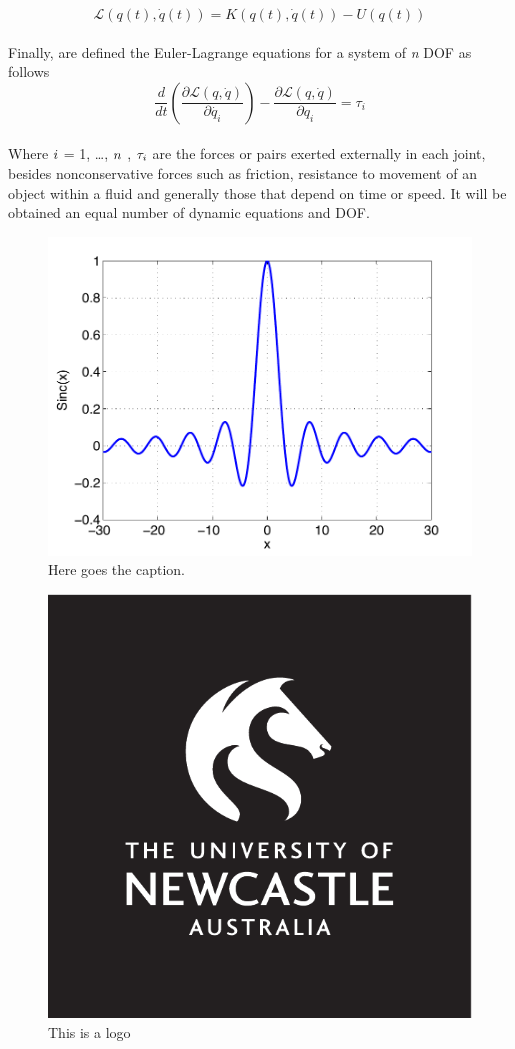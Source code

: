 \documentclass{UoNMCHA}
\numberwithin{equation}{section}
\begin{document}
\begin{equation}\label{eq:Lagrangian general term}
\mathcal{L}(q(t),\dot{q}(t)) = K(q(t),\dot{q}(t)) - U(q(t))
\end{equation}
\\
Finally, are defined the Euler-Lagrange equations for a system of \textit{n} DOF as follows
\\
\begin{equation}\label{eq:Lagrangian general term}
\frac{d}{dt}\left(\frac{\partial \mathcal{L}(q,\dot{q})}{\partial \dot{q_i}}\right) - \frac{\partial \mathcal{L}(q,\dot{q})}{\partial q_i} = \tau_i
\end{equation}
\\
Where $\boldmath{i}$ = 1, \dots, $\boldmath{n}$ , $\boldmath{\tau_i}$ are the forces or pairs exerted externally in each joint, besides nonconservative
forces such as friction, resistance to movement of an object within a fluid and generally those that depend
on time or speed. It will be obtained an equal number of dynamic equations and DOF.
%
\begin{figure}[ht]
    \begin{center}
        \includegraphics[width=.6\linewidth]{Figures/SincPlot}
        \caption{Here goes the caption.}
        \label{fig:Sinc}
    \end{center}
\end{figure}



\begin{figure}
	\centering
	\includegraphics[width=0.7\linewidth]{LOGO_Square}
	\caption{This is a logo}
	\label{fig:logosquare}
\end{figure}
\end{document}
